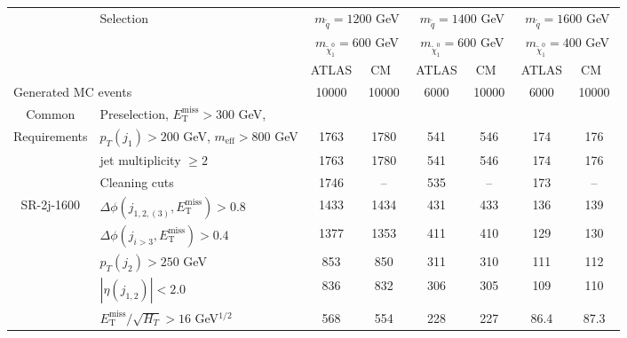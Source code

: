 \documentclass[10pt,fleqn]{article}
\newcommand{\met}{E^\mathrm{miss}_\mathrm{T}}
\newcommand{\meff}{m_\mathrm{eff}}
\begin{document}
\begin{table}[H]  \centering
 \renewcommand*{\arraystretch}{1.}
 \begin{tabular}{c|l|c|c|c|c|c|c} \toprule
      & Selection & \multicolumn{2}{c|}{$m_{\tilde{q}} = 1200$ GeV}      & \multicolumn{2}{c|}{$m_{\tilde{q}} = 1400$ GeV}         & \multicolumn{2}{c}{$m_{\tilde{q}} = 1600$ GeV}         \\ 
      &           & \multicolumn{2}{c|}{$m_{\tilde{\chi}^0_1} = 600$ GeV}  & \multicolumn{2}{c|}{$m_{\tilde{\chi}^0_1} = 600$ GeV}   & \multicolumn{2}{c}{$m_{\tilde{\chi}^0_1} = 400$ GeV}     \\ \midrule
      &           & ATLAS             &  ~CM~~                           & ATLAS             & ~CM~~                            & ATLAS             & ~CM~~                            \\ \midrule
\multicolumn{2}{l|}{Generated MC events}                       &   10000    &   10000   &  6000      &  10000    &      6000    &  10000         \\ \midrule   
Common       & Preselection, $\met > 300$ GeV,                 &          &   &   &  & & \\ 
Requirements & $p_T(j_1) > 200$ GeV, $\meff > 800$ GeV         &     1763   &   1780    &  541       &   546     &      174     &   176         \\
             & jet multiplicity $\geq 2$                       &     1763   &   1780    &  541       &   546     &      174     &   176         \\
             & Cleaning cuts                                   &     1746   &   --      &  535       &   --      &      173     &   --          \\ \midrule
SR-2j-1600   & $\Delta\phi(j_{1,2,(3)},\met) > 0.8$            &     1433   &   1434    &  431       &   433     &      136     &   139         \\
             & $\Delta\phi(j_{i>3},\met) > 0.4$                &     1377   &   1353    &  411       &   410     &      129     &   130         \\
             & $p_T(j_2) > 250$ GeV                            &      853   &    850    &  311       &   310     &      111     &   112         \\      
             & $|\eta(j_{1,2})|< 2.0$                          &      836   &    832    &  306       &   305     &      109     &   110         \\                   
             & $\met/\sqrt{H_T} > 16$ GeV$^{1/2}$              &      568   &    554    &  228       &   227     &      86.4    &   87.3         \\    

\end{tabular}
\end{table}
\end{document}
